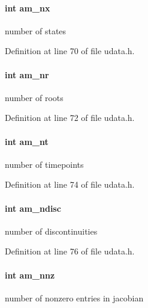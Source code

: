 \paragraph[{am\+\_\+nx}]{\setlength{\rightskip}{0pt plus 5cm}int am\+\_\+nx}\label{struct_user_data_a00ba9cf99f8f02b663241bb76b76ce96}
number of states 

Definition at line 70 of file udata.\+h.

\hypertarget{struct_user_data_aa56d89d6184e84681395d1b00069f883}{}
\paragraph[{am\+\_\+nr}]{\setlength{\rightskip}{0pt plus 5cm}int am\+\_\+nr}\label{struct_user_data_aa56d89d6184e84681395d1b00069f883}
number of roots 

Definition at line 72 of file udata.\+h.

\hypertarget{struct_user_data_a08ea6ecb241cd86a6f171761a48e27dd}{}
\paragraph[{am\+\_\+nt}]{\setlength{\rightskip}{0pt plus 5cm}int am\+\_\+nt}\label{struct_user_data_a08ea6ecb241cd86a6f171761a48e27dd}
number of timepoints 

Definition at line 74 of file udata.\+h.

\hypertarget{struct_user_data_adc94a5ce0a5314355aae8e05060c13da}{}
\paragraph[{am\+\_\+ndisc}]{\setlength{\rightskip}{0pt plus 5cm}int am\+\_\+ndisc}\label{struct_user_data_adc94a5ce0a5314355aae8e05060c13da}
number of discontinuities 

Definition at line 76 of file udata.\+h.

\hypertarget{struct_user_data_a43ad1c7f840dc744be4251902a4ae91d}{}
\paragraph[{am\+\_\+nnz}]{\setlength{\rightskip}{0pt plus 5cm}int am\+\_\+nnz}\label{struct_user_data_a43ad1c7f840dc744be4251902a4ae91d}
number of nonzero entries in jacobian 

